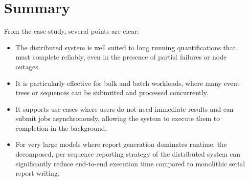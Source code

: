 \section{Summary}

From the case study, several points are clear:

\begin{itemize}
  \item The distributed system is well suited to long running quantifications that must complete reliably, even in the presence of partial failures or node outages.
  \item It is particularly effective for bulk and batch workloads, where many event trees or sequences can be submitted and processed concurrently.
  \item It supports use cases where users do not need immediate results and can submit jobs asynchronously, allowing the system to execute them to completion in the background.
  \item For very large models where report generation dominates runtime, the decomposed, per-sequence reporting strategy of the distributed system can significantly reduce end-to-end execution time compared to monolithic serial report writing.
\end{itemize}

\fi



